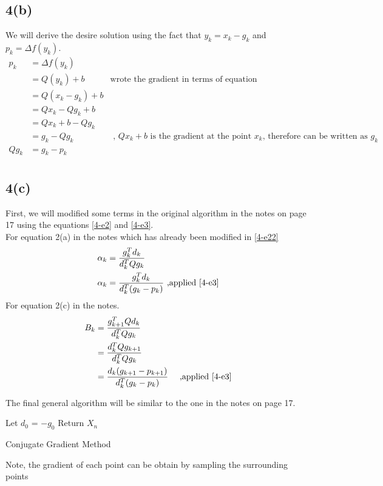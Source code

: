 \subsection*{4(b)}
We will derive the desire solution using the fact that $y_k = x_k - g_k$ and $p_k = \Delta f(y_k)$.
\begin{equation}\label{4-e3}
\begin{aligned}
p_k &= \Delta f(y_k) &\\
&= Q(y_k) + b & \mbox{wrote the gradient in terms of equation}\\
&= Q(x_k - g_k) + b &\\
&= Qx_k - Qg_k + b &\\
&= Qx_k + b - Qg_k&\\
&= g_k - Qg_k & \mbox{ , $Qx_k + b$ is the gradient at the point $x_k$, therefore can be written as $g_k$}\\
Qg_k &= g_k - p_k &\\ 
\end{aligned}
\end{equation}

\subsection*{4(c)}
First, we will modified some terms in the original algorithm in the notes on page 17 using the equations \ref{4-e2} and \ref{4-e3}.\\
For equation 2(a) in the notes which has already been modified in \ref{4-e22}
\begin{equation*}
\begin{aligned}
\alpha_k &= \frac{g_k^Td_k}{d_k^TQg_k}\\
\alpha_k &= \frac{g_k^Td_k}{d_k^T(g_k - p_k)} \mbox{ ,applied \ref{4-e3}}
\end{aligned}
\end{equation*}
For equation 2(c) in the notes.
\begin{equation}
\begin{aligned}
B_k &= \frac{g_{k+1}^TQd_k}{d_k^TQg_k}&\\
&= \frac{d_{k}^TQg_{k+1}}{d_{k}^TQg_{k}}&\\
&= \frac{d_k(g_{k+1} - p_{k+1})}{d_k^T(g_k - p_k)}& \mbox{ ,applied \ref{4-e3}}
\end{aligned}
\end{equation}

The final general algorithm will be similar to the one in the notes on page 17.\\
\begin{algorithm}[H]
  Let $d_0$ = $-g_0$\;
  Return $X_n$\;
  \caption{Conjugate Gradient Method}
\end{algorithm}
Note, the gradient of each point can be obtain by sampling the surrounding points